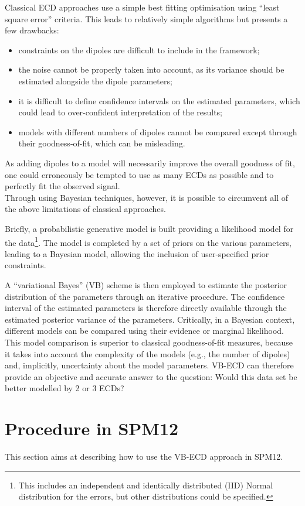 Classical ECD approaches use a simple best fitting optimisation using ``least square error'' criteria. This leads to relatively simple algorithms but presents a few drawbacks:
\begin{itemize}
\item constraints on the dipoles are difficult to include in the framework;
\item the noise cannot be properly taken into account, as its variance should be estimated alongside the dipole parameters;
\item it is difficult to define confidence intervals on the estimated parameters, which could lead to over-confident interpretation of the results;
\item models with different numbers of dipoles cannot be compared except through their goodness-of-fit, which can be misleading.
\end{itemize}
As adding dipoles to a model will necessarily improve the overall goodness of fit, one could erroneously be tempted to use as many ECDs as possible and to perfectly fit the observed signal.
\\
Through using Bayesian techniques, however, it is possible to circumvent all of the above limitations of classical approaches.

Briefly, a probabilistic generative model is built providing a likelihood model for the data\footnote{This includes an independent and identically distributed (IID) Normal distribution for the errors, but other distributions could be specified.}. The model is completed by a set of priors on the various parameters, leading to a Bayesian model, allowing the inclusion of user-specified prior constraints. 

A ``variational Bayes'' (VB) scheme is then employed to estimate the posterior distribution of the parameters through an iterative procedure. The confidence interval of the estimated parameters is therefore directly available through the estimated posterior variance of the parameters.
Critically, in a Bayesian context, different models can be compared using their evidence or marginal likelihood. This model comparison is superior to classical goodness-of-fit measures, because it takes into account the complexity of the models (e.g., the number of dipoles) and, implicitly, uncertainty about the model parameters. VB-ECD can therefore provide an objective and accurate answer to the question: Would this data set be better modelled by 2 or 3 ECDs?

\section{Procedure in SPM12}
This section aims at describing how to use the VB-ECD approach in SPM12.

